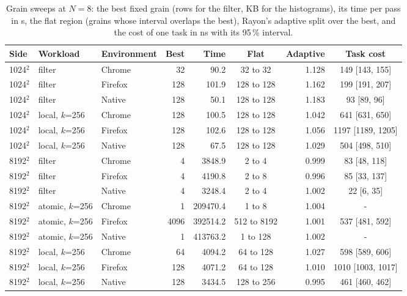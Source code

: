 \begin{table}[htbp]
\caption{Grain sweeps at $N=8$: the best fixed grain (rows for the filter, KB for the histograms), its time per pass in \textmu s, the flat region (grains whose interval overlaps the best), Rayon's adaptive split over the best, and the cost of one task in ns with its 95\,\% interval.}\label{tab:grain-best}
\centering\footnotesize
\begin{tabular}{lllrrcrc}
\toprule
Side & Workload & Environment & Best & Time & Flat & Adaptive & Task cost \\
\midrule
1024$^2$ & filter & Chrome & 32 & 90.2 & 32 to 32 & 1.128 & 149 [143, 155] \\
1024$^2$ & filter & Firefox & 128 & 101.9 & 128 to 128 & 1.162 & 199 [191, 207] \\
1024$^2$ & filter & Native & 128 & 50.1 & 128 to 128 & 1.183 & 93 [89, 96] \\
1024$^2$ & local, $k$=256 & Chrome & 128 & 100.5 & 128 to 128 & 1.042 & 641 [631, 650] \\
1024$^2$ & local, $k$=256 & Firefox & 128 & 102.6 & 128 to 128 & 1.056 & 1197 [1189, 1205] \\
1024$^2$ & local, $k$=256 & Native & 128 & 67.5 & 128 to 128 & 1.029 & 504 [498, 510] \\
8192$^2$ & filter & Chrome & 4 & 3848.9 & 2 to 4 & 0.999 & 83 [48, 118] \\
8192$^2$ & filter & Firefox & 4 & 4190.8 & 2 to 8 & 0.996 & 85 [33, 137] \\
8192$^2$ & filter & Native & 4 & 3248.4 & 2 to 4 & 1.002 & 22 [6, 35] \\
8192$^2$ & atomic, $k$=256 & Chrome & 1 & 209470.4 & 1 to 8 & 1.004 & - \\
8192$^2$ & atomic, $k$=256 & Firefox & 4096 & 392514.2 & 512 to 8192 & 1.001 & 537 [481, 592] \\
8192$^2$ & atomic, $k$=256 & Native & 1 & 413763.2 & 1 to 128 & 1.002 & - \\
8192$^2$ & local, $k$=256 & Chrome & 64 & 4094.2 & 64 to 128 & 1.027 & 598 [589, 606] \\
8192$^2$ & local, $k$=256 & Firefox & 128 & 4071.2 & 64 to 128 & 1.010 & 1010 [1003, 1017] \\
8192$^2$ & local, $k$=256 & Native & 128 & 3434.5 & 128 to 256 & 0.995 & 461 [460, 462] \\
\bottomrule
\end{tabular}
\end{table}
